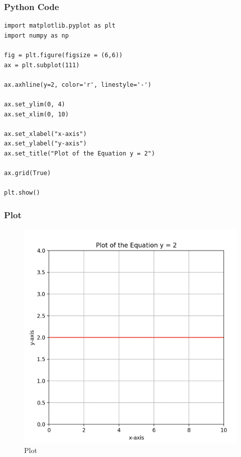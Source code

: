 \documentclass{beamer}
\begin{document}
\begin{frame}[fragile]
    \frametitle{Python Code}
    \begin{lstlisting}
import matplotlib.pyplot as plt
import numpy as np

fig = plt.figure(figsize = (6,6))
ax = plt.subplot(111)

ax.axhline(y=2, color='r', linestyle='-')

ax.set_ylim(0, 4)
ax.set_xlim(0, 10)

ax.set_xlabel("x-axis")
ax.set_ylabel("y-axis")
ax.set_title("Plot of the Equation y = 2")

ax.grid(True)

plt.show()

\end{lstlisting}

\end{frame}

\begin{frame}
\frametitle{Plot}
\begin{figure}[H]
    \centering
    \includegraphics[width=0.6\columnwidth]{Figs/Y=2.png}
    \caption{Plot}
    \label{fig:placeholder}
\end{figure}

\end{frame}
\end{document}
